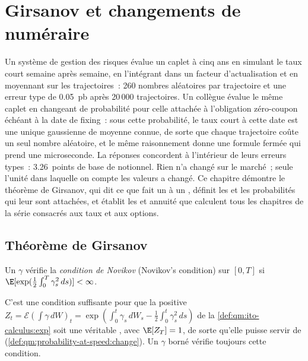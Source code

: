 \chapter{Girsanov et changements de numéraire}\label{ch:qm:girsanov-and-changes-of-numeraire}

Un système de gestion des risques évalue un caplet à cinq ans en simulant le taux court semaine après semaine,
en l'intégrant dans un facteur d'actualisation et en moyennant sur les trajectoires~: 260 nombres aléatoires par trajectoire et une
erreur type de 0.05~pb après 20\,000 trajectoires. Un collègue évalue le même caplet en changeant de probabilité pour celle
attachée à l'obligation zéro-coupon échéant à la date de fixing~:
sous cette probabilité, le taux court à cette date est une unique gaussienne de moyenne connue, de sorte que chaque trajectoire coûte
un seul nombre aléatoire, et le même raisonnement donne une formule fermée qui prend une microseconde. La
réponses concordent à l'intérieur de leurs erreurs types~: 3.26~points de base de notionnel. Rien n'a changé sur le
marché~; seule l'unité dans laquelle on compte les valeurs a changé. Ce chapitre démontre le
théorème de Girsanov, qui dit ce que fait un  à un , définit les  et
les probabilités  qui leur sont attachées, et établit les  et annuité que
calculent tous les chapitres de la série consacrés aux taux et aux options.

\section{Théorème de Girsanov}

\begin{definition}\label{def:qm:girsanov-and-changes-of-numeraire:novikov}
Un  $\gamma$ vérifie la \emph{condition de Novikov} (Novikov's condition) sur $[0,
T]$ si $\E[\exp(\tfrac12\int_0^T\gamma_s^2\,ds)] < \infty$.
\end{definition}

C'est une condition suffisante pour que la  positive $Z_t = \mathcal E(\int\gamma\,dW)_t =
\exp(\int_0^t\gamma_s\,dW_s - \tfrac12\int_0^t\gamma_s^2\,ds)$ de la \cref{def:qm:ito-calculus:exp} soit une
véritable , avec $\E[Z_T] = 1$, de sorte qu'elle puisse servir de 
(\cref{def:qm:probability-at-speed:change}). Un $\gamma$ borné vérifie toujours cette condition.

